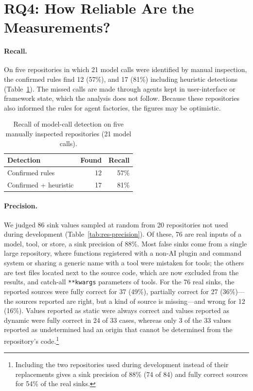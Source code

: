 \section{RQ4: How Reliable Are the Measurements?}
\label{sec:res-rq4}

\paragraph{Recall.} On five repositories in which 21 model calls were identified by manual inspection, the confirmed rules find 12 (57\%), and 17 (81\%) including heuristic detections (Table~\ref{tab:res-recall}). The missed calls are made through agents kept in user-interface or framework state, which the analysis does not follow. Because these repositories also informed the rules for agent factories, the figures may be optimistic.

\begin{table}[t]
\centering
\renewcommand{\arraystretch}{1.2}
\caption{Recall of model-call detection on five manually inspected repositories (21 model calls).}
\label{tab:res-recall}
\begin{tabular}{@{}lrr@{}}
\toprule
\textbf{Detection} & \textbf{Found} & \textbf{Recall} \\
\midrule
Confirmed rules         & 12 & 57\% \\
Confirmed + heuristic   & 17 & 81\% \\
\bottomrule
\end{tabular}
\end{table}

\paragraph{Precision.} We judged 86 sink values sampled at random from 20 repositories not used during development (Table~\ref{tab:res-precision}). Of these, 76 are real inputs of a model, tool, or store, a sink precision of 88\%. Most false sinks come from a single large repository, where functions registered with a non-AI plugin and command system or sharing a generic name with a tool were mistaken for tools; the others are test files located next to the source code, which are now excluded from the results, and catch-all \texttt{**kwargs} parameters of tools. For the 76 real sinks, the reported sources were fully correct for 37 (49\%), partially correct for 27 (36\%)---the sources reported are right, but a kind of source is missing---and wrong for 12 (16\%). Values reported as static were always correct and values reported as dynamic were fully correct in 24 of 33 cases, whereas only 3 of the 33 values reported as undetermined had an origin that cannot be determined from the repository's code.\footnote{Including the two repositories used during development instead of their replacements gives a sink precision of 88\% (74 of 84) and fully correct sources for 54\% of the real sinks.}

